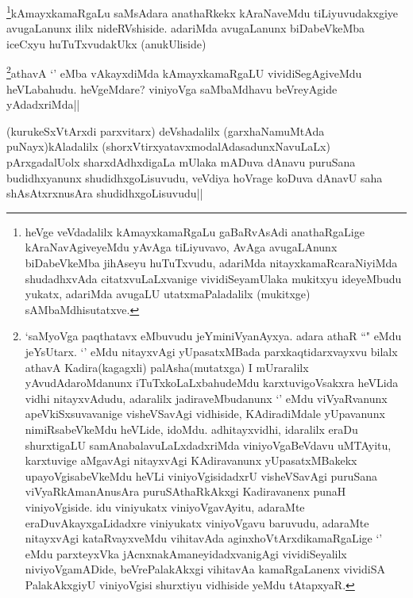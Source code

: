 
\begin{artha}
\footnote{heVge veVdadalilx kAmayxkamaRgaLu gaBaRvAsAdi anathaRgaLige kAraNavAgiveyeMdu yAvAga tiLiyuvavo, AvAga avugaLAnunx biDabeVkeMba jihAseyu huTuTxvudu, adariMda nitayxkamaRcaraNiyiMda shudadhxvAda citatxvuLaLxvanige vividiSeyamUlaka mukitxyu ideyeMbudu yukatx, adariMda avugaLU utatxmaPaladalilx (mukitxge) sAMbaMdhisutatxve.}kAmayxkamaRgaLu saMsAdara anathaRkekx kAraNaveMdu tiLiyuvudakxgiye avugaLanunx ililx nideRVshiside. adariMda avugaLanunx biDabeVkeMba iceCxyu huTuTxvudakUkx (anukUliside)
\end{artha}


\begin{artha}
\footnote{`saMyoVga paqthatavx eMbuvudu jeYminiVyanAyxya. adara athaR ``\stext" eMdu jeYsUtarx. `\stext' eMdu nitayxvAgi yUpasatxMBada parxkaqtidarxvayxvu bilalx athavA Kadira(kagagxli) palAsha(mutatxga) I mUraralilx yAvudAdaroMdanunx iTuTxkoLaLxbahudeMdu karxtuvigoVsakxra heVLida vidhi nitayxvAdudu, adaralilx jadiraveMbudanunx `\stext' eMdu viVyaRvanunx apeVkiSxsuvavanige visheVSavAgi vidhiside, KAdiradiMdale yUpavanunx nimiRsabeVkeMdu heVLide, idoMdu. adhitayxvidhi, idaralilx eraDu shurxtigaLU samAnabalavuLaLxdadxriMda viniyoVgaBeVdavu uMTAyitu, karxtuvige aMgavAgi nitayxvAgi KAdiravanunx yUpasatxMBakekx upayoVgisabeVkeMdu heVLi viniyoVgisidadxrU visheVSavAgi puruSana viVyaRkAmanAnusAra puruSAthaRkAkxgi Kadiravanenx punaH viniyoVgiside. idu viniyukatx viniyoVgavAyitu, adaraMte eraDuvAkayxgaLidadxre viniyukatx viniyoVgavu baruvudu, adaraMte nitayxvAgi kataRvayxveMdu vihitavAda aginxhoVtArxdikamaRgaLige `\stext' eMdu parxteyxVka jAcnxnakAmaneyidadxvanigAgi vividiSeyalilx niviyoVgamADide, beVrePalakAkxgi vihitavAa kamaRgaLanenx vividiSA PalakAkxgiyU viniyoVgisi shurxtiyu vidhiside yeMdu tAtapxyaR.}athavA `\stext' eMba vAkayxdiMda kAmayxkamaRgaLU vividiSegAgiveMdu heVLabahudu. heVgeMdare? viniyoVga saMbaMdhavu beVreyAgide yAdadxriMda||
\end{artha}


\begin{artha}
(kurukeSxVtArxdi parxvitarx) deVshadalilx (garxhaNamuMtAda puNayx)kAladalilx (shorxVtirxyatavxmodalAdasadunxNavuLaLx) pArxgadalUolx sharxdAdhxdigaLa mUlaka mADuva dAnavu puruSana budidhxyanunx shudidhxgoLisuvudu, veVdiya hoVrage koDuva dAnavU saha shAsAtxrxnusAra shudidhxgoLisuvudu||
\end{artha}

